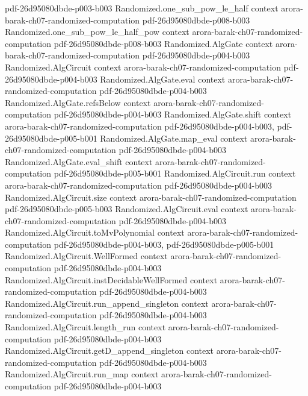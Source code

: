 \begin{theorem}
  {pdf-26d95080dbde-p003-b003}
\proofstep
  {Randomized.one_sub_pow_le_half}
  {context}
  {arora-barak-ch07-randomized-computation}
  {pdf-26d95080dbde-p008-b003}
\proofstep
  {Randomized.one_sub_pow_le_half_pow}
  {context}
  {arora-barak-ch07-randomized-computation}
  {pdf-26d95080dbde-p008-b003}
\proofstep
  {Randomized.AlgGate}
  {context}
  {arora-barak-ch07-randomized-computation}
  {pdf-26d95080dbde-p004-b003}
\proofstep
  {Randomized.AlgCircuit}
  {context}
  {arora-barak-ch07-randomized-computation}
  {pdf-26d95080dbde-p004-b003}
\proofstep
  {Randomized.AlgGate.eval}
  {context}
  {arora-barak-ch07-randomized-computation}
  {pdf-26d95080dbde-p004-b003}
\proofstep
  {Randomized.AlgGate.refsBelow}
  {context}
  {arora-barak-ch07-randomized-computation}
  {pdf-26d95080dbde-p004-b003}
\proofstep
  {Randomized.AlgGate.shift}
  {context}
  {arora-barak-ch07-randomized-computation}
  {pdf-26d95080dbde-p004-b003,
    pdf-26d95080dbde-p005-b001}
\proofstep
  {Randomized.AlgGate.map_eval}
  {context}
  {arora-barak-ch07-randomized-computation}
  {pdf-26d95080dbde-p004-b003}
\proofstep
  {Randomized.AlgGate.eval_shift}
  {context}
  {arora-barak-ch07-randomized-computation}
  {pdf-26d95080dbde-p005-b001}
\proofstep
  {Randomized.AlgCircuit.run}
  {context}
  {arora-barak-ch07-randomized-computation}
  {pdf-26d95080dbde-p004-b003}
\proofstep
  {Randomized.AlgCircuit.size}
  {context}
  {arora-barak-ch07-randomized-computation}
  {pdf-26d95080dbde-p005-b003}
\proofstep
  {Randomized.AlgCircuit.eval}
  {context}
  {arora-barak-ch07-randomized-computation}
  {pdf-26d95080dbde-p004-b003}
\proofstep
  {Randomized.AlgCircuit.toMvPolynomial}
  {context}
  {arora-barak-ch07-randomized-computation}
  {pdf-26d95080dbde-p004-b003,
    pdf-26d95080dbde-p005-b001}
\proofstep
  {Randomized.AlgCircuit.WellFormed}
  {context}
  {arora-barak-ch07-randomized-computation}
  {pdf-26d95080dbde-p004-b003}
\proofstep
  {Randomized.AlgCircuit.instDecidableWellFormed}
  {context}
  {arora-barak-ch07-randomized-computation}
  {pdf-26d95080dbde-p004-b003}
\proofstep
  {Randomized.AlgCircuit.run_append_singleton}
  {context}
  {arora-barak-ch07-randomized-computation}
  {pdf-26d95080dbde-p004-b003}
\proofstep
  {Randomized.AlgCircuit.length_run}
  {context}
  {arora-barak-ch07-randomized-computation}
  {pdf-26d95080dbde-p004-b003}
\proofstep
  {Randomized.AlgCircuit.getD_append_singleton}
  {context}
  {arora-barak-ch07-randomized-computation}
  {pdf-26d95080dbde-p004-b003}
\proofstep
  {Randomized.AlgCircuit.run_map}
  {context}
  {arora-barak-ch07-randomized-computation}
  {pdf-26d95080dbde-p004-b003}

\end{theorem}
